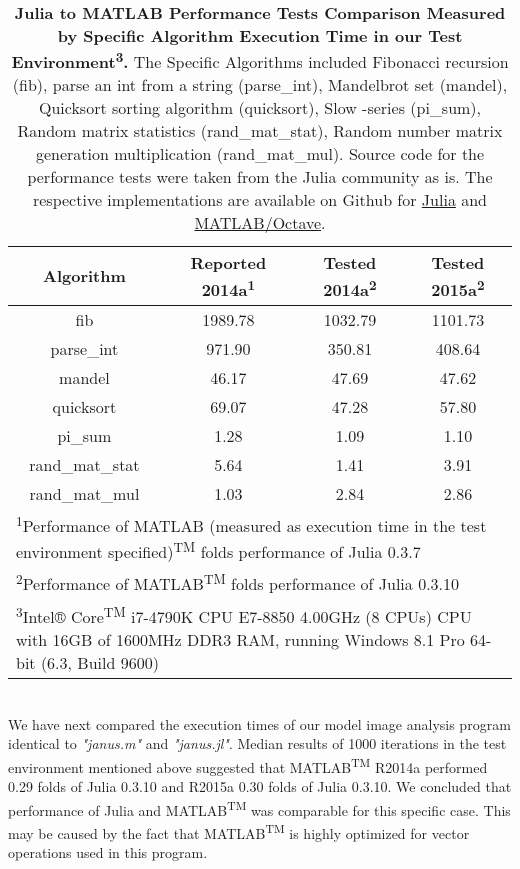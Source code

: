 \begin{table} 
    \begin{tabular}{cccc}
    \hline
        \textbf{Algorithm} & \textbf{Reported 2014a\textsuperscript{1}} & \textbf{Tested  2014a\textsuperscript{2}} & \textbf{Tested 2015a\textsuperscript{2}}\\
        \hline
        fib & 1989.78 & 1032.79 & 1101.73 \\ 
        \hline
        parse\_int & 971.90 & 350.81 & 408.64 \\ 
        \hline
        mandel & 46.17 & 47.69 & 47.62 \\ 
        \hline
        quicksort & 69.07 & 47.28 & 57.80 \\ 
        \hline
        pi\_sum & 1.28 & 1.09 & 1.10 \\ 
        \hline
        rand\_mat\_stat & 5.64 & 1.41 & 3.91 \\ 
        \hline
        rand\_mat\_mul & 1.03 & 2.84 & 2.86 \\
        \hline
        \multicolumn{4}{l}{\textsuperscript{1}Performance of MATLAB (measured as execution time in the test environment specified)\textsuperscript{TM} folds performance of Julia 0.3.7} \\
        \multicolumn{4}{l}{\textsuperscript{2}Performance of MATLAB\textsuperscript{TM} folds performance of Julia 0.3.10} \\
        \multicolumn{4}{l}{\textsuperscript{3}Intel® Core\textsuperscript{TM} i7-4790K CPU E7-8850 4.00GHz (8 CPUs) CPU with 16GB of 1600MHz DDR3 RAM, running Windows 8.1 Pro 64-bit (6.3, Build 9600)} \\
    \end{tabular}
    \caption{\textbf{Julia to MATLAB Performance Tests Comparison Measured by Specific Algorithm Execution Time in our Test Environment\textsuperscript{3}.} The Specific Algorithms included Fibonacci recursion (fib), parse an int from a string (parse\_int), Mandelbrot set (mandel), Quicksort sorting algorithm (quicksort), Slow \pi -series (pi\_sum), Random matrix statistics (rand\_mat\_stat), Random number matrix generation multiplication (rand\_mat\_mul). Source code for the performance tests were taken from the Julia community as is. The respective implementations are available on Github for \href{https://github.com/JuliaLang/julia/blob/master/test/perf/micro/perf.jl}{Julia} and \href{https://github.com/JuliaLang/julia/blob/master/test/perf/micro/perf.m}{MATLAB/Octave}.}
\end{table}\\
  
We have next compared the execution times of our model image analysis program identical to \textit{"janus.m"} and \textit{"janus.jl"}. Median results of 1000 iterations in the test environment mentioned above suggested that MATLAB\textsuperscript{TM} R2014a performed 0.29 folds of Julia 0.3.10 and R2015a 0.30 folds of Julia 0.3.10. We concluded that performance of Julia and MATLAB\textsuperscript{TM} was comparable for this specific case. This may be caused by the fact that MATLAB\textsuperscript{TM} is highly optimized for vector operations used in this program.
